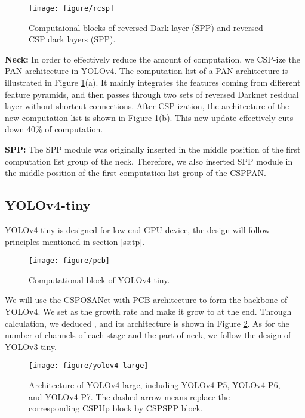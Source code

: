 \documentclass[10pt,twocolumn,letterpaper]{article}
\begin{document}
\begin{figure}[h]
	\begin{center}
		\texttt{[image: figure/rcsp]}
	\end{center}
	\vspace{-4mm}
	\caption{Computaional blocks of reversed Dark layer (SPP) and reversed CSP dark layers (SPP).}
	\label{fig:rcsp}
\end{figure}

\noindent
\textbf{Neck:} In order to effectively reduce the amount of computation, we CSP-ize the PAN \cite{liu2018path} architecture in YOLOv4.  The computation list of a PAN architecture is illustrated in Figure \ref{fig:rcsp}(a).  It mainly integrates the features coming from different feature pyramids, and then passes through two sets of reversed Darknet residual layer without shortcut connections.  After CSP-ization, the architecture of the new computation list is shown in Figure \ref{fig:rcsp}(b). This new update effectively cuts down 40\% of computation.

\noindent
\textbf{SPP:} The SPP module was originally inserted in the middle position of the first computation list group of the neck.  Therefore, we also inserted SPP module in the middle position of the first computation list group of the CSPPAN.

\subsection{YOLOv4-tiny}

YOLOv4-tiny is designed for low-end GPU device, the design will follow principles mentioned in section \ref{ss:tp}.

\begin{figure}[h]
	\begin{center}
		\texttt{[image: figure/pcb]}
	\end{center}
	\vspace{-4mm}
	\caption{Computational block of YOLOv4-tiny.}
	\label{fig:pcb}
\end{figure}

We will use the CSPOSANet with PCB architecture to form the backbone of YOLOv4. We set  as the growth rate and make it grow to  at the end.  Through calculation, we deduced , and its architecture is shown in Figure \ref{fig:pcb}.  As for the number of channels of each stage and the part of neck, we follow the design of YOLOv3-tiny.

\begin{figure*}[t]
	\begin{center}
		\texttt{[image: figure/yolov4-large]}
	\end{center}
	\vspace{-4mm}
	\caption{Architecture of YOLOv4-large, including YOLOv4-P5, YOLOv4-P6, and YOLOv4-P7. The dashed arrow means replace the corresponding CSPUp block by CSPSPP block.}
	\label{fig:yolov4-large}
\end{figure*}
\end{document}
